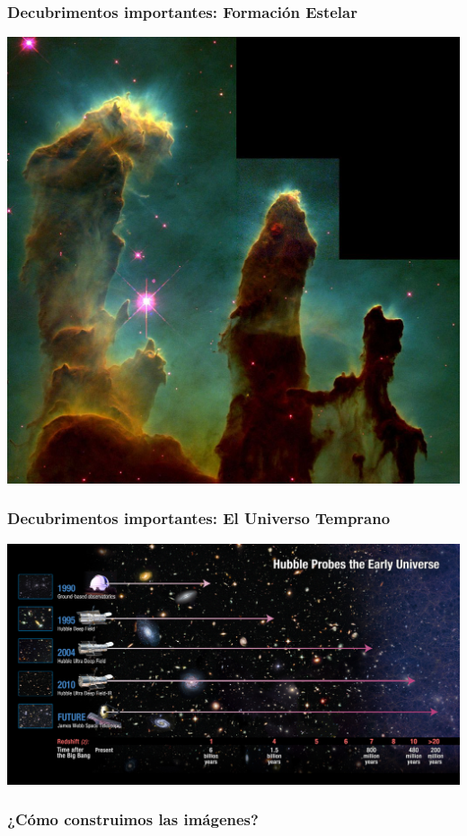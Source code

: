 \documentclass{beamer}
\begin{document}
\begin{frame}
  \frametitle{Decubrimentos importantes: Formación Estelar}
  \includegraphics{1039px-Eagle_nebula_pillars}
\end{frame}

\begin{frame}
  \frametitle{Decubrimentos importantes: El Universo Temprano}
  \includegraphics{hst-early-universe}
\end{frame}

\begin{frame}
  \frametitle{¿Cómo construimos las imágenes?}
\end{frame}
\end{document}
